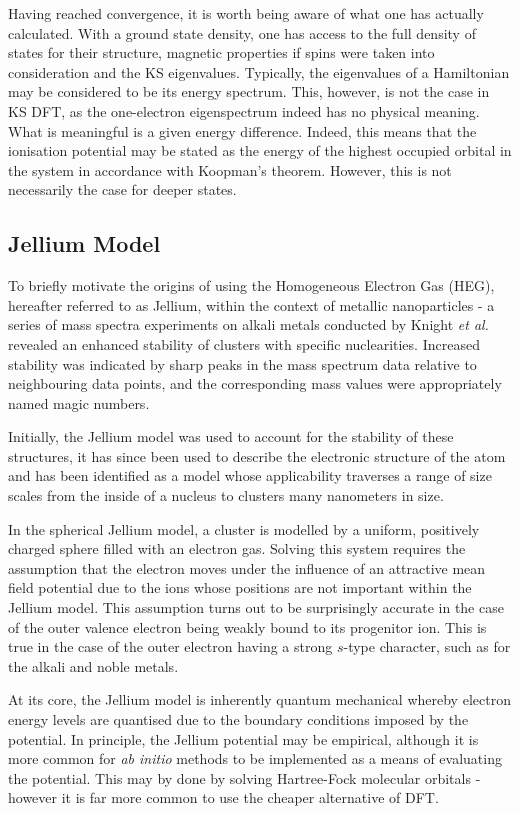 Having reached convergence, it is worth being aware of what one has actually calculated. With a ground state density, one has access to the full density of states for their structure, magnetic properties if spins were taken into consideration and the KS eigenvalues. Typically, the eigenvalues of a Hamiltonian may be considered to be its energy spectrum. This, however, is not the case in KS DFT, as the one-electron eigenspectrum indeed has no physical meaning. What is meaningful is a given energy difference. Indeed, this means that the ionisation potential may be stated as the energy of the highest occupied orbital in the system in accordance with Koopman's theorem. However, this is not necessarily the case for deeper states.


\subsection{Jellium Model}
\label{sec:JML_Thr}
To briefly motivate the origins of using the Homogeneous Electron Gas (HEG), hereafter referred to as Jellium, within the context of metallic nanoparticles - a series of mass spectra experiments on alkali metals conducted by Knight \textit{et al.} \cite{Knight_Cluster} revealed an enhanced stability of clusters with specific nuclearities. Increased stability was indicated by sharp peaks in the mass spectrum data relative to neighbouring data points, and the corresponding mass values were appropriately named magic numbers.

Initially, the Jellium model was used to account for the stability of these structures, it has since been used to describe the electronic structure of the atom and has been identified as a model whose applicability traverses a range of size scales from the inside of a nucleus to clusters many nanometers in size.

In the spherical Jellium model, a cluster is modelled by a uniform, positively charged sphere filled with an electron gas. Solving this system requires the assumption that the electron moves under the influence of an attractive mean field potential due to the ions whose positions are not important within the Jellium model. This assumption turns out to be surprisingly accurate in the case of the outer valence electron being weakly bound to its progenitor ion. This is true in the case of the outer electron having a strong $s$-type character, such as for the alkali and noble metals.

At its core, the Jellium model is inherently quantum mechanical whereby electron energy levels are quantised due to the boundary conditions imposed by the potential. In principle, the Jellium potential may be empirical, although it is more common for \textit{ab initio} methods to be implemented as a means of evaluating the potential. This may by done by solving Hartree-Fock molecular orbitals - however it is far more common to use the cheaper alternative of DFT.

